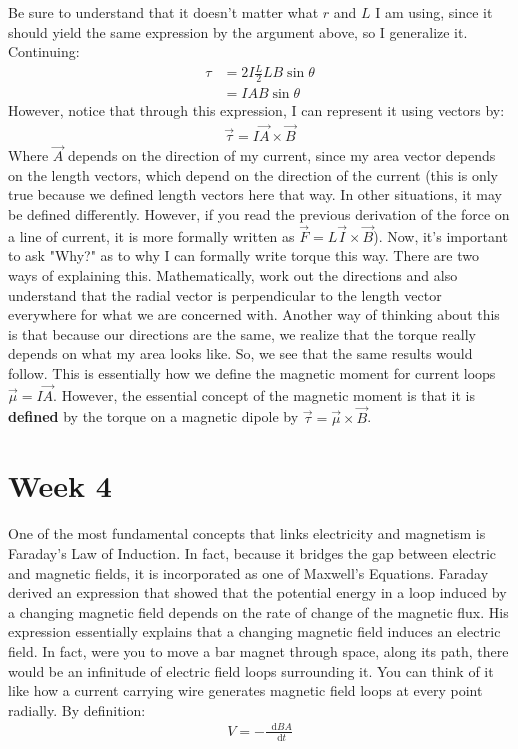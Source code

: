 \documentclass{article}
\newcommand*\dif{\mathop{}\!\mathrm{d}}
\begin{document}
Be sure to understand that it doesn't matter what $r$ and $L$ I am using, since it should yield the same expression by the argument above, so I generalize it. Continuing:
\begin{align*}
\tau &= 2I\frac{L}{2}LB\sin{\theta}\\
&= IAB\sin{\theta}
\end{align*}
However, notice that through this expression, I can represent it using vectors by:
\begin{align*}
\vec{\tau} = I\vec{A}\times\vec{B}
\end{align*}
Where $\vec{A}$ depends on the direction of my current, since my area vector depends on the length vectors, which depend on the direction of the current (this is only true because we defined length vectors here that way. In other situations, it may be defined differently. However, if you read the previous derivation of the force on a line of current, it is more formally written as $\vec{F} = L\vec{I}\times\vec{B}$). 
Now, it's important to ask "Why?" as to why I can formally write torque this way. There are two ways of explaining this. Mathematically, work out the directions and also understand that the radial vector is perpendicular to the length vector everywhere for what we are concerned with. Another way of thinking about this is that because our directions are the same, we realize that the torque really depends on what my area looks like. So, we see that the same results would follow. This is essentially how we define the magnetic moment for current loops $\vec{\mu} = I\vec{A}$. However, the essential concept of the magnetic moment is that it is \textbf{defined} by the torque on a magnetic dipole by $\vec{\tau} = \vec{\mu}\times\vec{B}$.




\pagebreak

\section{Week 4}
One of the most fundamental concepts that links electricity and magnetism is Faraday's Law of Induction. In fact, because it bridges the gap between electric and magnetic fields, it is incorporated as one of Maxwell's Equations. Faraday derived an expression that showed that the potential energy in a loop induced by a changing magnetic field depends on the rate of change of the magnetic flux. His expression essentially explains that a changing magnetic field induces an electric field. In fact, were you to move a bar magnet through space, along its path, there would be an infinitude of electric field loops surrounding it. You can think of it like how a current carrying wire generates magnetic field loops at every point radially. By definition: 
\begin{align*}
V = -\frac{\dif BA}{\dif t}
\end{align*}
\end{document}
